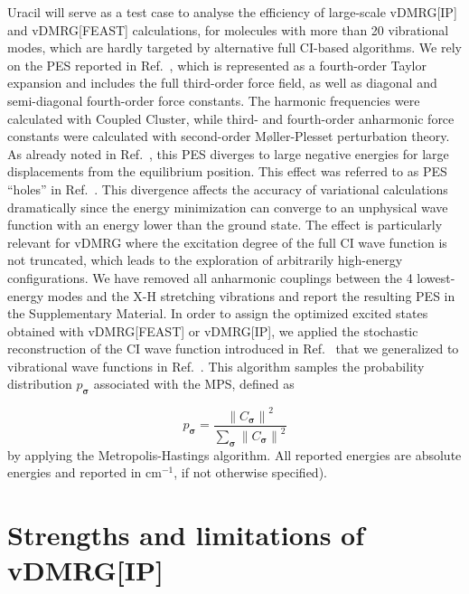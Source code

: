 \documentclass[journal=jctcce]{achemso}
\begin{document}
\noindent Uracil will serve as a test case to analyse the efficiency of large-scale vDMRG[IP] and vDMRG[FEAST] calculations, for molecules with more than 20 vibrational modes, which are hardly targeted by alternative full CI-based algorithms.
We rely on the PES reported in Ref.~, which is represented as a fourth-order Taylor expansion and includes the full third-order force field, as well as diagonal and semi-diagonal fourth-order force constants.
The harmonic frequencies were calculated with Coupled Cluster,\cite{Puzzarini2011_Uracil-Composite} while third- and fourth-order anharmonic force constants were calculated with second-order M{\o}ller-Plesset perturbation theory.\cite{Krasnoshchekov2015_Uracil}
As already noted in Ref.~, this PES diverges to large negative energies for large displacements from the equilibrium position.
This effect was referred to as PES ``holes'' in Ref.~.
This divergence affects the accuracy of variational calculations dramatically\cite{Carrington2018_Uracil} since the energy minimization can converge to an unphysical wave function with an energy lower than the ground state.
The effect is particularly relevant for vDMRG where the excitation degree of the full CI wave function is not truncated, which 
leads to the exploration of arbitrarily high-energy configurations.
We have removed all anharmonic couplings between the 4 lowest-energy modes and the X-H stretching vibrations and report the resulting PES in the Supplementary Material.
In order to assign the optimized excited states obtained with vDMRG[FEAST] or vDMRG[IP], we applied the stochastic reconstruction of the CI wave function introduced in Ref.~ that we generalized to vibrational wave functions in Ref.~.
This algorithm samples the probability distribution $p_{\bm{\sigma}}$ associated with the MPS, defined as

\begin{equation}
  p_{\bm{\sigma}} = \frac{\left\| C_{\bm{\sigma}} \right\|^2}{\sum_{\bm{\sigma}} \left\| C_{\bm{\sigma}} \right\|^2}
  \label{eq:CI_Probability}
\end{equation}
%
by applying the Metropolis-Hastings algorithm.
All reported energies are absolute energies and reported in cm$^{-1}$, if not otherwise specified).

\section{Strengths and limitations of vDMRG[IP]}
\label{sec:IPI}
\end{document}
